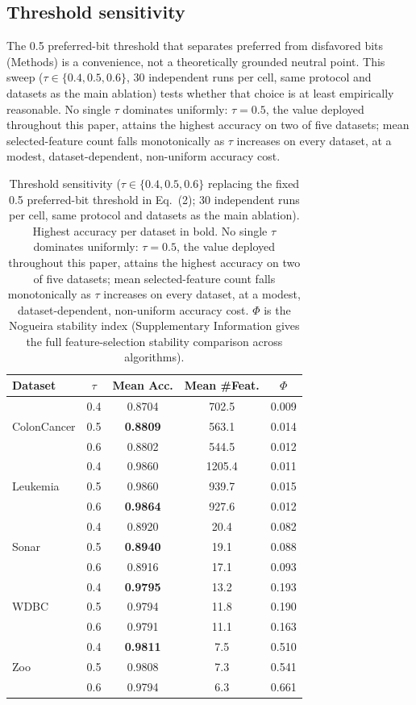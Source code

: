 \documentclass[preprint,3p,times]{elsarticle}
\begin{document}
\subsection{Threshold sensitivity}
The 0.5 preferred-bit threshold that separates preferred from disfavored
bits (Methods) is a convenience, not a theoretically grounded neutral point.
This sweep ($\tau\in\{0.4,0.5,0.6\}$, 30 independent runs per cell, same
protocol and datasets as the main ablation) tests whether that choice is at
least empirically reasonable. No single $\tau$ dominates uniformly:
$\tau=0.5$, the value deployed throughout this paper, attains the highest
accuracy on two of five datasets; mean selected-feature count falls
monotonically as $\tau$ increases on every dataset, at a modest,
dataset-dependent, non-uniform accuracy cost.

\begin{table}[!tbp]
\centering
\caption{Threshold sensitivity ($\tau\in\{0.4,0.5,0.6\}$ replacing the fixed 0.5 preferred-bit threshold in Eq.~(2); 30 independent runs per cell, same protocol and datasets as the main ablation). Highest accuracy per dataset in bold. No single $\tau$ dominates uniformly: $\tau=0.5$, the value deployed throughout this paper, attains the highest accuracy on two of five datasets; mean selected-feature count falls monotonically as $\tau$ increases on every dataset, at a modest, dataset-dependent, non-uniform accuracy cost. $\Phi$ is the Nogueira stability index (Supplementary Information gives the full feature-selection stability comparison across algorithms).}
\label{tab:threshold}
\footnotesize
\begin{tabular}{lcccc}
\toprule
Dataset & $\tau$ & Mean Acc. & Mean \#Feat. & $\Phi$ \\
\midrule
\multirow{3}{*}{ColonCancer} & 0.4 & 0.8704 & 702.5 & 0.009 \\
 & 0.5 & \textbf{0.8809} & 563.1 & 0.014 \\
 & 0.6 & 0.8802 & 544.5 & 0.012 \\
\midrule
\multirow{3}{*}{Leukemia} & 0.4 & 0.9860 & 1205.4 & 0.011 \\
 & 0.5 & 0.9860 & 939.7 & 0.015 \\
 & 0.6 & \textbf{0.9864} & 927.6 & 0.012 \\
\midrule
\multirow{3}{*}{Sonar} & 0.4 & 0.8920 & 20.4 & 0.082 \\
 & 0.5 & \textbf{0.8940} & 19.1 & 0.088 \\
 & 0.6 & 0.8916 & 17.1 & 0.093 \\
\midrule
\multirow{3}{*}{WDBC} & 0.4 & \textbf{0.9795} & 13.2 & 0.193 \\
 & 0.5 & 0.9794 & 11.8 & 0.190 \\
 & 0.6 & 0.9791 & 11.1 & 0.163 \\
\midrule
\multirow{3}{*}{Zoo} & 0.4 & \textbf{0.9811} & 7.5 & 0.510 \\
 & 0.5 & 0.9808 & 7.3 & 0.541 \\
 & 0.6 & 0.9794 & 6.3 & 0.661 \\
\bottomrule
\end{tabular}
\end{table}
\end{document}
